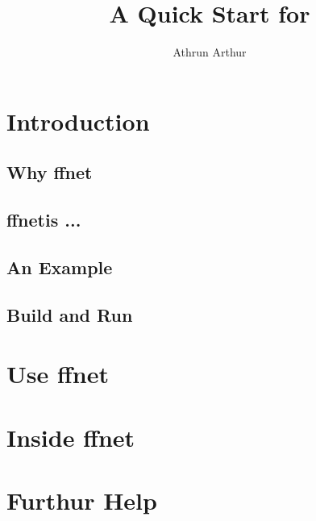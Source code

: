 \documentclass{article}
\author{Athrun Arthur}
\title{A Quick Start for \ffnet{}}
\newcommand{\ffnet} {\textsf{ffnet}}
\begin{document}
\maketitle
\tableofcontents
\section{Introduction}
\subsection{Why \ffnet}

\subsection{\ffnet is ...}

\subsection{An Example}
\subsection{Build and Run}

\section{Use \ffnet}

\section{Inside \ffnet}
\section{Furthur Help}
\end{document}
